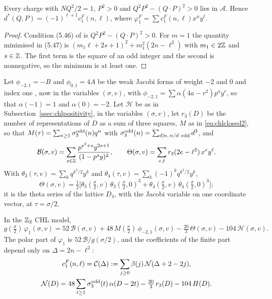 \begin{lemma}\label{lem:chlunitsetA}
Every charge with $NQ^2/2=1$, $P^2>0$ and $Q^2P^2-(Q\cdot P)^2>0$ lies in $\mathcal A$. Hence $d^*(Q,P)=(-1)^{\ell+1}c^F_1(n,\ell)$, where $\varphi^F_1=\sum c^F_1(n,\ell)x^ny^\ell$.
\end{lemma}

\begin{proof}
Condition (5.46) of \cite{BSS25} is $Q^2P^2-(Q\cdot P)^2>0$. For $m=1$ the quantity minimised in (5.47) is $(m_1\ell+2s+1)^2+m_1^2(2n-\ell^2)$ with $m_1\in 2\mathbb{Z}$ and $s\in\mathbb{Z}$. The first term is the square of an odd integer and the second is nonnegative, so the minimum is at least one.
\end{proof}

Let $\phi_{-2,1}=-B$ and $\phi_{0,1}=4A$ be the weak Jacobi forms of weight $-2$ and $0$ and index one \cite{EZ85}, now in the variables $(\sigma,v)$, with $\phi_{-2,1}=\sum\alpha(4a-r^2)p^ay^r$, so that $\alpha(-1)=1$ and $\alpha(0)=-2$. Let $\mathcal H$ be as in Subsection~\ref{ssec:chlpositivity}, in the variables $(\sigma,v)$, let $r_3(D)$ be the number of representations of $D$ as a sum of three squares, $M$ as in \eqref{eq:chlclosed2}, so that $M(\tau)=\sum_{n\ge1}\sigma_3^{\rm odd}(n)q^n$ with $\sigma_3^{\rm odd}(n)=\sum_{d\mid n,\,n/d\ \text{odd}}d^3$, and
\[
\mathcal B(\sigma,v)=\sum_{s\in\mathbb{Z}}\frac{p^{s^2+s}y^{2s+1}}{(1-p^sy)^2},\qquad
\Theta(\sigma,v)=\sum_{e,\ell}r_3(2e-\ell^2)\,x^ey^\ell .
\]
With $\theta_3(\tau,v)=\sum_kq^{k^2/2}y^k$ and $\theta_4(\tau,v)=\sum_k(-1)^kq^{k^2/2}y^k$,
\[
\Theta(\sigma,v)=\tfrac12\big[\theta_3(\tfrac\sigma2,v)\,\theta_3(\tfrac\sigma2,0)^3+\theta_4(\tfrac\sigma2,v)\,\theta_4(\tfrac\sigma2,0)^3\big];
\]
it is the theta series of the lattice $D_4$, with the Jacobi variable on one coordinate vector, at $\tau=\sigma/2$.

\begin{proposition}\label{prop:chlunitclosed}
In the $\mathbb{Z}_2$ CHL model,
\begin{equation}\label{eq:chlunitclosed}
g(\tfrac\sigma2)\,\varphi_1(\sigma,v)=52\,\mathcal B(\sigma,v)+48\,M(\tfrac\sigma2)\,\phi_{-2,1}(\sigma,v)-\tfrac{20}3\,\Theta(\sigma,v)-104\,\mathcal H(\sigma,v).
\end{equation}
The polar part of $\varphi_1$ is $52\,\mathcal B/g(\sigma/2)$, and the coefficients of the finite part depend only on $\Delta=2n-\ell^2$:
\begin{equation}\label{eq:chlunitcoeff}
\begin{gathered}
c^F_1(n,\ell)=\mathcal C(\Delta):=\sum_{j\ge0}\beta(j)\,\mathcal N(\Delta+2-2j),\\
\mathcal N(D)=48\sum_{t\ge1}\sigma_3^{\rm odd}(t)\,\alpha(D-2t)-\tfrac{20}3\,r_3(D)-104\,H(D).
\end{gathered}
\end{equation}
\end{proposition}

